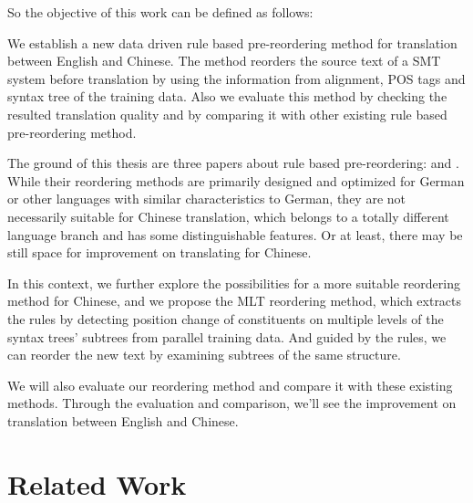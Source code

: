 So the objective of this work can be defined as follows:

\begin{center}
\parbox[c]{0.8\textwidth}{
We establish a new data driven rule based pre-reordering method for translation between English and Chinese. The method reorders the source text of a SMT system before translation by using the information from alignment, POS tags and syntax tree of the training data. Also we evaluate this method by checking the resulted translation quality and by comparing it with other existing rule based pre-reordering method.
}
\end{center}

The ground of this thesis are three papers about rule based pre-reordering: \cite{short, long} and \cite{tree}. While their reordering methods are primarily designed and optimized for German or other languages with similar characteristics to German, they are not necessarily suitable for Chinese translation, which belongs to a totally different language branch and has some distinguishable features. Or at least, there may be still space for improvement on translating for Chinese.

In this context, we further explore the possibilities for a more suitable reordering method for Chinese, and we propose the MLT reordering method, which extracts the rules by detecting position change of constituents on multiple levels of the syntax trees' subtrees from parallel training data. And guided by the rules, we can reorder the new text by examining subtrees of the same structure.

We will also evaluate our reordering method and compare it with these existing methods. Through the evaluation and comparison, we'll see the improvement on translation between English and Chinese. 





\section{Related Work}
\label{ch:Introduction:sec:RelatedWork}

